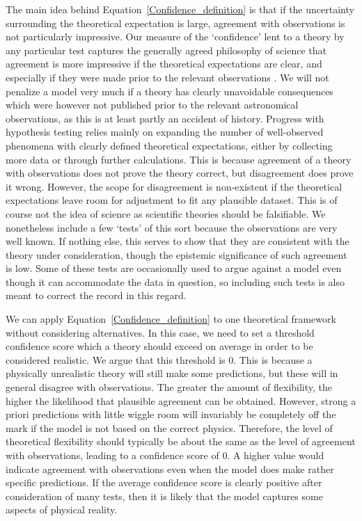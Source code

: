 \documentclass[fleqn,usenatbib,useAMS,onecolumn]{mnras} %
\begin{document}
The main idea behind Equation~\ref{Confidence_definition} is that if the uncertainty surrounding the theoretical expectation is large, agreement with observations is not particularly impressive. Our measure of the `confidence' lent to a theory by any particular test captures the generally agreed philosophy of science that agreement is more impressive if the theoretical expectations are clear, and especially if they were made prior to the relevant observations \citep{Merritt_2020}. We will not penalize a model very much if a theory has clearly unavoidable consequences which were however not published prior to the relevant astronomical observations, as this is at least partly an accident of history. Progress with hypothesis testing relies mainly on expanding the number of well-observed phenomena with clearly defined theoretical expectations, either by collecting more data or through further calculations. This is because agreement of a theory with observations does not prove the theory correct, but disagreement does prove it wrong. However, the scope for disagreement is non-existent if the theoretical expectations leave room for adjustment to fit any plausible dataset. This is of course not the idea of science as scientific theories should be falsifiable. We nonetheless include a few `tests' of this sort because the observations are very well known. If nothing else, this serves to show that they are consistent with the theory under consideration, though the epistemic significance of such agreement is low. Some of these tests are occasionally used to argue against a model even though it can accommodate the data in question, so including such tests is also meant to correct the record in this regard.

We can apply Equation~\ref{Confidence_definition} to one theoretical framework without considering alternatives. In this case, we need to set a threshold confidence score which a theory should exceed on average in order to be considered realistic. We argue that this threshold is 0. This is because a physically unrealistic theory will still make some predictions, but these will in general disagree with observations. The greater the amount of flexibility, the higher the likelihood that plausible agreement can be obtained. However, strong a priori predictions with little wiggle room will invariably be completely off the mark if the model is not based on the correct physics. Therefore, the level of theoretical flexibility should typically be about the same as the level of agreement with observations, leading to a confidence score of 0. A higher value would indicate agreement with observations even when the model does make rather specific predictions. If the average confidence score is clearly positive after consideration of many tests, then it is likely that the model captures some aspects of physical reality.
\end{document}
